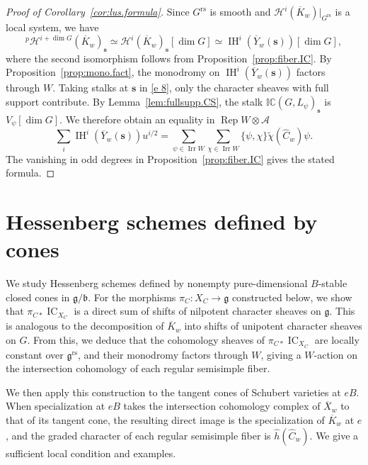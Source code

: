 \documentclass[11pt]{amsart}
\numberwithin{equation}{section}
\theoremstyle{definition}
\newcommand\grs{\mathfrak{g}^{\mathrm{rs}}}
\DeclareMathOperator{\Irr}{\mathrm{Irr}}
\DeclareMathOperator{\Rep}{\mathrm{Rep}}
\DeclareMathOperator{\IC}{\mathrm{IC}}
\def\cA{\mathcal {A}}
\def\cH{\mathcal {H}}
\def\fg{\mathfrak {g}}
\def\fb{\mathfrak {b}}
\def\Grs{G^{\mathrm{rs}}}
\DeclareMathOperator{\IH}{\mathrm{IH}}
\begin{document}
\begin{proof}[Proof of Corollary~\ref{cor:lus.formula}]
Since $\Grs$ is smooth and $\cH^i(\overline K_w)|_{\Grs}$ is a local system, we have
\[{}^p\cH^{i+\dim G}(\overline K_w)_{\mathbf s}\simeq\cH^{i}(\overline K_w)_{\mathbf s}[\dim G]\simeq\IH^i(\overline{Y}_w(\mathbf s))[\dim G],\]
where the second isomorphism follows from Proposition~\ref{prop:fiber.IC}.
By Proposition~\ref{prop:mono.fact}, the monodromy on $\IH^i(\overline Y_w(\mathbf{s}))$ factors through $W$.
Taking stalks at $\mathbf{s}$ in \eqref{e 8}, only the character sheaves with full support contribute. By
Lemma~\ref{lem:fullsupp.CS}, the stalk $\mathbb{IC}(G,L_{\psi})_{\mathbf{s}}$ is $V_{\psi}[\dim G]$. 
We therefore obtain an equality in $\Rep W\otimes\cA$
\[\sum_i %
\IH^{i}(\overline Y_w(\mathbf s)) u^{i/2} =  \sum_{\psi \in \Irr W}\sum_{\chi \in \Irr W}   \{\psi,\chi\}\widetilde\chi(  \widehat C _w  ) \psi.\]
The vanishing in odd degrees in Proposition~\ref{prop:fiber.IC} gives the stated formula.
\end{proof}


\section{Hessenberg schemes defined by cones}
\label{s:nonlinear}
We study Hessenberg schemes defined by nonempty pure-dimensional $B$-stable closed cones in $\fg/\fb$.
For the morphisms $\pi_C:X_C\to\fg$ constructed below, we show that $\pi_{C*}\IC_{X_C}$ is a direct sum of shifts of nilpotent character sheaves on $\fg$.
This is analogous to the decomposition of $\overline K_w$ into shifts of unipotent character sheaves on $G$.
From this, we deduce that the cohomology sheaves of $\pi_{C*}\IC_{X_C}$ are locally constant over $\grs$, and their monodromy factors through $W$, giving a $W$-action on the intersection cohomology of each regular semisimple fiber.

We then apply this construction to the tangent cones of Schubert varieties at $eB$.
When specialization at $eB$ takes the intersection cohomology complex of $\overline X_w$ to that of its tangent cone, the resulting direct image is the specialization of $\overline K_w$ at $e$, and the graded character of each regular semisimple fiber is $\widehat h(\widehat C_w)$.
We give a sufficient local condition and examples.
\end{document}
